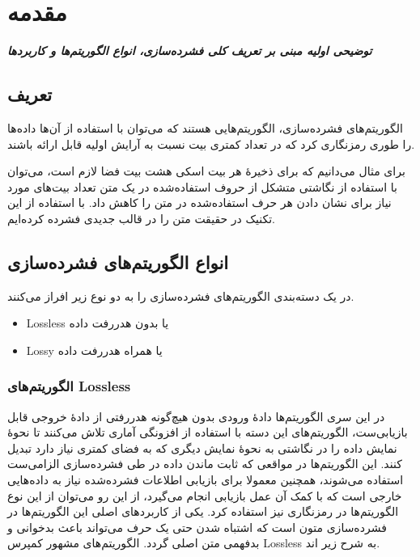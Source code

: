 \chapter{مقدمه}
\noindent
\textbf{
	\textit{
		توضیحی اولیه مبنی بر تعریف کلی فشرده‌سازی، انواع الگوریتم‌ها و کاربردها
	}
}
\pagebreak
\section{تعریف}

الگوریتم‌های فشرده‌سازی، الگوریتم‌هایی هستند که می‌توان با استفاده از آن‌ها داده‌ها را طوری رمزنگاری کرد که در تعداد کمتری بیت نسبت به آرایش اولیه
قابل ارائه باشند.

برای مثال می‌دانیم که برای ذخیرهٔ هر بیت اسکی هشت بیت فضا لازم است، می‌توان با استفاده از نگاشتی متشکل از حروف استفاده‌شده در 
یک متن تعداد بیت‌های مورد نیاز برای نشان دادن هر حرف استفاده‌شده در متن را کاهش داد.
با استفاده از این تکنیک در حقیقت متن را در قالب جدیدی فشرده کرده‌ایم.

\section{انواع الگوریتم‌های فشرده‌سازی}

در یک دسته‌بندی الگوریتم‌های فشرده‌سازی را به دو نوع زیر افراز می‌کنند.
\begin{itemize}
	\item Lossless یا بدون هدررفت داده
	\item Lossy یا همراه هدررفت داده
\end{itemize}

\subsection{الگوریتم‌های Lossless}
در این سری الگوریتم‌ها دادهٔ ورودی بدون هیچ‌گونه هدررفتی از دادهٔ خروجی قابل بازیابی‌ست، الگوریتم‌های 
این دسته با استفاده از افزونگی آماری تلاش می‌کنند تا نحوهٔ نمایش داده را در نگاشتی به نحوهٔ نمایش دیگری که به فضای کمتری نیاز دارد 
تبدیل کنند.
این الگوریتم‌ها در مواقعی که 
ثابت ماندن داده در طی فشرده‌سازی الزامی‌ست استفاده می‌شوند، همچنین معمولا برای بازیابی اطلاعات فشرده‌شده نیاز به 
داده‌هایی خارجی است که با کمک آن عمل بازیابی انجام می‌گیرد، از این رو می‌توان از این نوع الگوریتم‌ها در رمزنگاری نیز 
استفاده کرد. یکی از کاربردهای اصلی این الگوریتم‌ها در فشرده‌سازی متون است که اشتباه شدن حتی یک حرف می‌تواند باعث بدخوانی و 
بدفهمی متن اصلی گردد. الگوریتم‌های مشهور کمپرس Lossless به شرح زیر اند.

